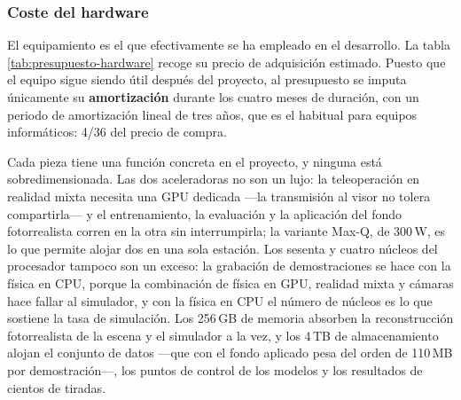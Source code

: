 \subsubsection{Coste del hardware}

El equipamiento es el que efectivamente se ha empleado en el desarrollo. La tabla
\ref{tab:presupuesto-hardware} recoge su precio de adquisición estimado. Puesto que el equipo sigue
siendo útil después del proyecto, al presupuesto se imputa únicamente su \textbf{amortización}
durante los cuatro meses de duración, con un periodo de amortización lineal de tres años, que es el
habitual para equipos informáticos: 4/36 del precio de compra.

\begin{table}[ht]
	\centering
	\caption{Equipamiento empleado y coste imputado}
	\label{tab:presupuesto-hardware}
\end{table}

Cada pieza tiene una función concreta en el proyecto, y ninguna está sobredimensionada. Las dos
aceleradoras no son un lujo: la teleoperación en realidad mixta necesita una GPU dedicada —la
transmisión al visor no tolera compartirla— y el entrenamiento, la evaluación y la aplicación del
fondo fotorrealista corren en la otra sin interrumpirla; la variante Max-Q, de 300\,W, es lo que
permite alojar dos en una sola estación. Los sesenta y cuatro núcleos del procesador tampoco son
un exceso: la grabación de demostraciones se hace con la física en CPU, porque la combinación de
física en GPU, realidad mixta y cámaras hace fallar al simulador, y con la física en CPU el número
de núcleos es lo que sostiene la tasa de simulación. Los 256\,GB de memoria absorben la
reconstrucción fotorrealista de la escena y el simulador a la vez, y los 4\,TB de almacenamiento
alojan el conjunto de datos —que con el fondo aplicado pesa del orden de 110\,MB por
demostración—, los puntos de control de los modelos y los resultados de cientos de tiradas.

